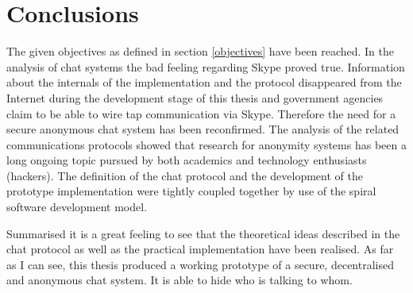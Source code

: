 \chapter{Conclusions}
The given objectives as defined in section
\ref{objectives} have been reached. In the analysis of chat systems
the bad feeling regarding Skype proved true. Information
about the internals of the implementation and the protocol disappeared
from the Internet during the development stage of this thesis
and government agencies claim to be able to wire tap
communication via Skype. Therefore the need for a secure anonymous chat system
has been reconfirmed.
The analysis of the related communications protocols showed that research
for anonymity systems has been a long ongoing topic pursued by both
academics and technology enthusiasts (hackers).
The definition of the chat protocol and the 
development of the prototype implementation were tightly
coupled together by use of the spiral software development model.

Summarised it is a great feeling to see that the theoretical ideas described
in the chat protocol as well as the practical implementation have been realised.
As far as I can see, this thesis produced a working prototype of a secure,
decentralised and anonymous chat system. 
It is able to hide who is talking to whom.
